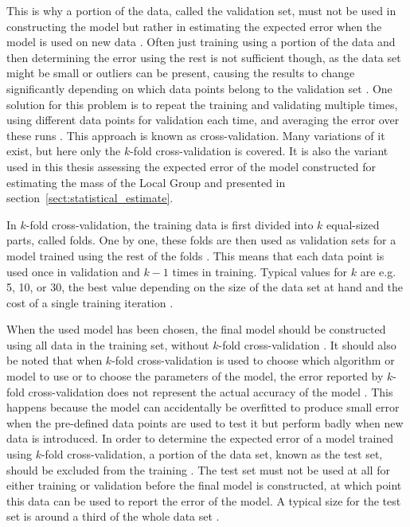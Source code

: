 \documentclass[english, twoside]{HYgradu}
\begin{document}
This is why a portion of the data, called the validation set, must not be used in constructing the model but rather in estimating the expected error when the model is used on new data \citep{alpaydin2014introduction}. Often just training using a portion of the data and then determining the error using the rest is not sufficient though, as the data set might be small or outliers can be present, causing the results to change significantly depending on which data points belong to the validation set \citep{alpaydin2014introduction}. One solution for this problem is to repeat the training and validating multiple times, using different data points for validation each time, and averaging the error over these runs \citep{alpaydin2014introduction}. This approach is known as cross-validation. Many variations of it exist, but here only the $k$-fold cross-validation is covered. It is also the variant used in this thesis assessing the expected error of the model constructed for estimating the mass of the Local Group and presented in section~\ref{sect:statistical_estimate}.

In $k$-fold cross-validation, the training data is first divided into $k$ equal-sized parts, called folds. One by one, these folds are then used as validation sets for a model trained using the rest of the folds \citep{alpaydin2014introduction, murphy2012machine}. This means that each data point is used once in validation and $k-1$ times in training. Typical values for $k$ are e.g. 5, 10, or 30, the best value depending on the size of the data set at hand and the cost of a single training iteration \citep{alpaydin2014introduction, murphy2012machine}.

When the used model has been chosen, the final model should be constructed using all data in the training set, without $k$-fold cross-validation \citep{alpaydin2014introduction}. It should also be noted that when $k$-fold cross-validation is used to choose which algorithm or model to use or to choose the parameters of the model, the error reported by $k$-fold cross-validation does not represent the actual accuracy of the model \citep{alpaydin2014introduction}. This happens because the model can accidentally be overfitted to produce small error when the pre-defined data points are used to test it but perform badly when new data is introduced. In order to determine the expected error of a model trained using $k$-fold cross-validation, a portion of the data set, known as the test set, should be excluded from the training \citep{alpaydin2014introduction}. The test set must not be used at all for either training or validation before the final model is constructed, at which point this data can be used to report the error of the model. A typical size for the test set is around a third of the whole data set \citep{alpaydin2014introduction}.
\end{document}
